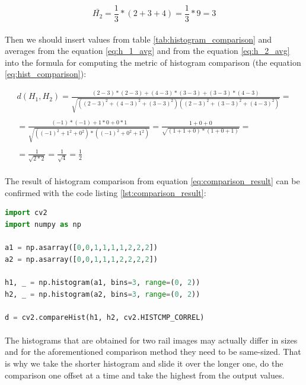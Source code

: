 \begin{equation}
	\bar{H_2} = \frac{1}{3} * (2 + 3 + 4) = \frac{1}{3} * 9 = 3
	\label{eq:h_2_avg}
\end{equation}

\paragraph{}
Then we should insert values from table \ref{tab:histogram_comparison} and averages from the equation \ref{eq:h_1_avg} and from the equation \ref{eq:h_2_avg} into the formula for computing the metric of histogram comparison (the equation \ref{eq:hist_comparison}):

\begin{equation}
\begin{aligned}
	d(H_1, H_2) = \frac{(2-3)*(2-3) + (4-3)*(3-3) + (3-3)*(4-3)}{\sqrt{((2-3)^2 + (4-3)^2 + (3-3)^2)((2-3)^2 + (3-3)^2 + (4-3)^2)}} = \\ \\ 
	= \frac{(-1) * (-1) + 1 * 0 + 0 * 1}{\sqrt{((-1)^2 + 1^2 + 0^2) * ((-1)^2 + 0^2 + 1^2)}} 
	= \frac{1 + 0 + 0}{\sqrt{(1+1+0)*(1+0+1)}} = \\ \\
	= \frac{1}{\sqrt{2 * 2}} = \frac{1}{\sqrt{4}} = \frac{1}{2}
	\label{eq:comparison_result}
\end{aligned}
\end{equation}

\paragraph{}
The result of histogram comparison from equation \ref{eq:comparison_result} can be confirmed with the code listing \ref{lst:comparison_result}:

\begin{lstlisting}[language=Python, caption=Histogram comparison in Python, label={lst:comparison_result},basicstyle={\ttfamily}]
import cv2
import numpy as np

a1 = np.asarray([0,0,1,1,1,1,2,2,2])
a2 = np.asarray([0,0,1,1,1,2,2,2,2])

h1, _ = np.histogram(a1, bins=3, range=(0, 2))
h2, _ = np.histogram(a2, bins=3, range=(0, 2))

d = cv2.compareHist(h1, h2, cv2.HISTCMP_CORREL)
\end{lstlisting}

\paragraph{}
The histograms that are obtained for two rail images may actually differ in sizes and for the aforementioned comparison method they need to be same-sized. That is why we take the shorter histogram and slide it over the longer one, do the comparison one offset at a time and take the highest from the output values.

